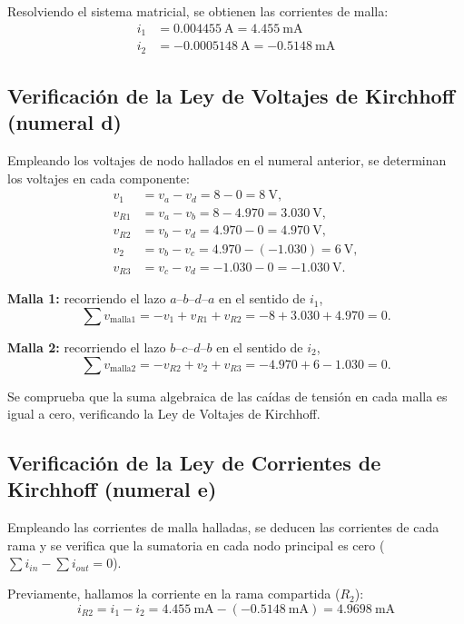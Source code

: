 \documentclass[conference,10pt]{IEEEtran}
\begin{document}
Resolviendo el sistema matricial, se obtienen las corrientes de malla:
\begin{align*}
    i_1 &= 0.004455~\mathrm{A} = 4.455~\mathrm{mA} \\
    i_2 &= -0.0005148~\mathrm{A} = -0.5148~\mathrm{mA}
\end{align*}

\subsection{Verificación de la Ley de Voltajes de Kirchhoff (numeral d)}
Empleando los voltajes de nodo hallados en el numeral anterior, se determinan los voltajes en cada componente:
\begin{align}
  v_1 &= v_a - v_d = 8 - 0 = 8~\mathrm{V},\\
  v_{R1} &= v_a - v_b = 8 - 4.970 = 3.030~\mathrm{V},\\
  v_{R2} &= v_b - v_d = 4.970 - 0 = 4.970~\mathrm{V},\\
  v_2 &= v_b - v_c = 4.970-(-1.030) = 6~\mathrm{V},\\
  v_{R3} &= v_c - v_d = -1.030 - 0 = -1.030~\mathrm{V}.
\end{align}

\textbf{Malla 1:} recorriendo el lazo $a$--$b$--$d$--$a$ en el sentido de $i_1$,
\begin{equation}
  \sum v_{\text{malla}1} = -v_1 + v_{R1} + v_{R2} = -8 + 3.030 + 4.970 = 0.
\end{equation}

\textbf{Malla 2:} recorriendo el lazo $b$--$c$--$d$--$b$ en el sentido de $i_2$,
\begin{equation}
  \sum v_{\text{malla}2} = -v_{R2} + v_2 + v_{R3} = -4.970 + 6 - 1.030 = 0.
\end{equation}

Se comprueba que la suma algebraica de las caídas de tensión en cada malla es igual a cero, verificando la Ley de Voltajes de Kirchhoff.

\subsection{Verificación de la Ley de Corrientes de Kirchhoff (numeral e)}
Empleando las corrientes de malla halladas, se deducen las corrientes de cada rama y se verifica que la sumatoria en cada nodo principal es cero ($\sum i_{in} - \sum i_{out} = 0$).

Previamente, hallamos la corriente en la rama compartida ($R_2$):
\begin{equation*}
    i_{R2} = i_1 - i_2 = 4.455~\mathrm{mA} - (-0.5148~\mathrm{mA}) = 4.9698~\mathrm{mA}
\end{equation*}
\end{document}
